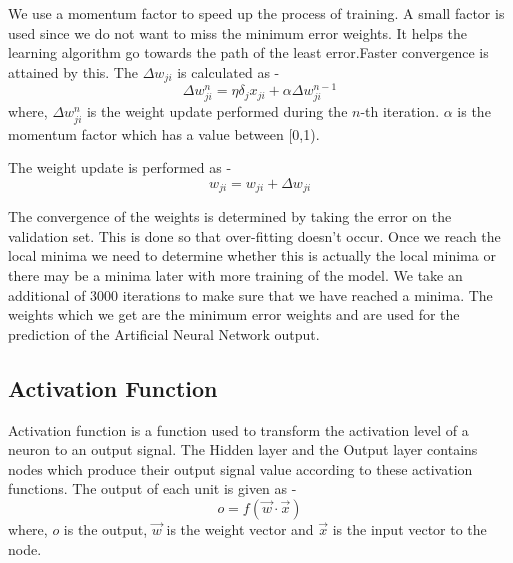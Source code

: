 \documentclass[a4paper,12bp]{report}
\begin{document}
\begin{enumerate}
We use a momentum factor to speed up the process of training. A small factor is used since we do not want to miss the minimum error weights. It helps the learning algorithm go towards the path of the least error.Faster convergence is attained by this. The $\Delta w_{ji}$ is calculated as - 
\begin{equation}
\Delta w_{ji}^n = \eta \delta_j x_{ji} + \alpha \Delta w_{ji}^{n-1}
\end{equation}
where, $\Delta w_{ji}^n$ is the weight update performed during the $n$-th iteration. $\alpha$ is the momentum factor which has a value between [0,1). 

The weight update is performed as - 
\begin{equation}
w_{ji} = w_{ji} + \Delta w_{ji}
\end{equation}
\end{enumerate}

The convergence of the weights is determined by taking the error on the validation set. This is done so that over-fitting doesn't occur. Once we reach the local minima we need to determine whether this is actually the local minima or there may be a minima later with more training of the model. We take an additional of 3000 iterations to make sure that we have reached a minima. The weights which we get are the minimum error weights and are used for the prediction of the Artificial Neural Network output.

\subsection{Activation Function}
\label{subsec:activation}
Activation function is a function used to transform the activation level of a neuron to an output signal. The Hidden layer and the Output layer contains nodes which produce their output signal value according to these activation functions. The output of each unit is given as - 
\begin{equation}
o = f(\vec{w} \cdot \vec{x})
\end{equation}
where, $o$ is the output, $\vec{w}$ is the weight vector and $\vec{x}$ is the input vector to the node. 
\end{document}
